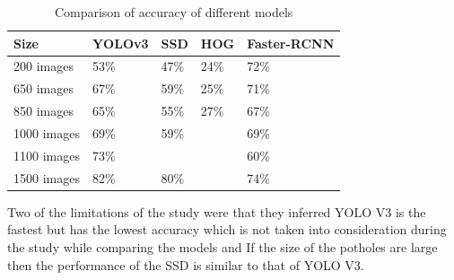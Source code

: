 \begin{table}[h]
\begin{center}
  \begin{tabular}{|l|l|l|l|l|}
\hline
\textbf{Size} & \textbf{YOLOv3} & \textbf{SSD} & \textbf{HOG} & \textbf{Faster-RCNN} \\ \hline
200 images    & 53\%            & 47\%         & 24\%         & 72\%                 \\ \hline
650 images    & 67\%            & 59\%         & 25\%         & 71\%                 \\ \hline
850 images    & 65\%            & 55\%         & 27\%         & 67\%                 \\ \hline
1000 images   & 69\%            & 59\%         &              & 69\%                 \\ \hline
1100 images   & 73\%            &              &              & 60\%                 \\ \hline
1500 images   & 82\%            & 80\%         &              & 74\%                 \\ \hline
\end{tabular}  
\end{center}

\caption{Comparison of accuracy of different models}
\label{tab:my-table}
\end{table}

\noindent
Two of the limitations of the study were that they inferred YOLO V3 is the fastest but has the lowest accuracy which is not taken into consideration during the study while comparing the models and If the size of the potholes are large then the performance of the SSD is similar to that of YOLO V3.


